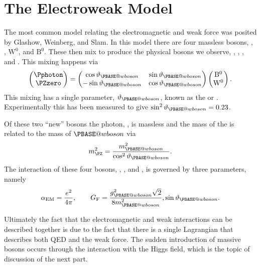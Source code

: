 \documentclass[fleqn]{NotesClass}
\makeatletter
\newcommand{\Pwboson}{\ensuremath{\PBASE@wboson}}
\newcommand{\PW}{\Pwboson}
\newcommand{\PWz}{\ensuremath{\mathrm{W}^0}}
\newcommand{\PBz}{\ensuremath{\mathrm{B}^0}}
\newcommand*{\fermiconst}{G_{\mathrm{F}}}
\makeatother
\begin{document}
    \section{The Electroweak Model}
    The most common model relating the electromagnetic and weak force was posited by Glashow, Weinberg, and Slam.
    In this model there are four massless bosons, \PWp, \PWm, \PWz, and \PBz.
    These then mix to produce the physical bosons we observe, \PWp, \PWm, \PZzero, and \Pphoton.
    This mixing happens via
    \begin{equation}
        \begin{pmatrix}
            \Pphoton\\ \PZzero
        \end{pmatrix}
        =
        \begin{pmatrix}
            \cos\vartheta_{\PW} & \sin\vartheta_{\PW}\\
            -\sin\vartheta_{\PW} & \cos\vartheta_{\PW}
        \end{pmatrix}
        \begin{pmatrix}
            \PBz\\ \PWz
        \end{pmatrix}
        .
    \end{equation}
    This mixing has a single parameter, \(\vartheta_{\PW}\), known as the  or .
    Experimentally this has been measured to give \(\sin^2\vartheta_{\PW} = 0.23\).
    
    Of these two \enquote{new} bosons the photon, \Pphoton, is massless and the mass of the \PZzero{} is related to the mass of \PW{} via
    \begin{equation}
        m_{\PZ}^2 = \frac{m_{\PW}^2}{\cos^2\vartheta_{\PW}}.
    \end{equation}
    The interaction of these four bosons, \PWpm, \PZzero, and \Pphoton, is governed by three parameters, namely
    \begin{equation}
        \alpha_{\mathrm{EM}} = \frac{e^2}{4\pi}, \qquad \fermiconst = \frac{g_{\PW}^2\sqrt{2}}{8m_{\PW}^2}, \sin\vartheta_{\PW}.
    \end{equation}
    
    Ultimately the fact that the electromagnetic and weak interactions can be described together is due to the fact that there is a single Lagrangian that describes both QED and the weak force.
    The sudden introduction of massive bosons occurs through the interaction with the Higgs field, which is the topic of discussion of the next part.
    
\end{document}
